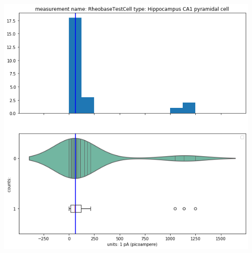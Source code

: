     \begin{center}
   \includegraphics[width=0.7\linewidth]{notebooks_converted/needata_thesis_files/needata_thesis_5_34}
    \end{center}
    { \hspace*{\fill} \\}
    
